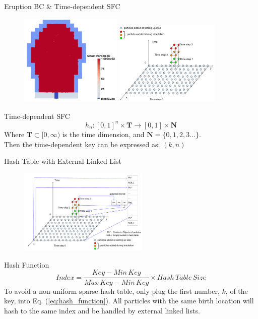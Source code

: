 \documentclass{beamer}
\begin{document}
\begin{frame}{Eruption BC $\&$ Time-dependent SFC}
\begin{figure}
\flushleft
\includegraphics[width=0.435\textwidth]{../Boundary-condition-eps-converted-to}
\hfill
\includegraphics[width=0.445\textwidth]{Particle_adding}
\end{figure}
\begin{block}{Time-dependent SFC}
\begin{equation}
h_n: [0,1]^n \times \textbf{T} \rightarrow [0,1] \times \textbf{N}
\end{equation}
Where $\textbf{T} \subset [0,\infty)$ is the time dimension, and $\textbf{N}=\lbrace 0, 1, 2, 3...\rbrace$. \\
Then the time-dependent key can be expressed as: $(k,n)$
\end{block}
\end{frame}

\begin{frame}{Hash Table with External Linked List}
\begin{figure}
\includegraphics[width=0.55\textwidth]{../Particle_adding_with_link}
\end{figure}
\begin{block}{Hash Function}
\begin{equation}
Index= \frac{Key - Min\,Key}{Max\,Key - Min\,Key} 
\times Hash\,Table\,Size 
\label{eq:hash_function}
\end{equation}
To avoid a non-uniform sparse hash table, only plug the first number, $k$, of the key, into Eq. (\ref{eq:hash_function}). All particles with the same birth location will hash to the same index and be handled by external linked lists.
\end{block}
\end{frame}
\end{document}
